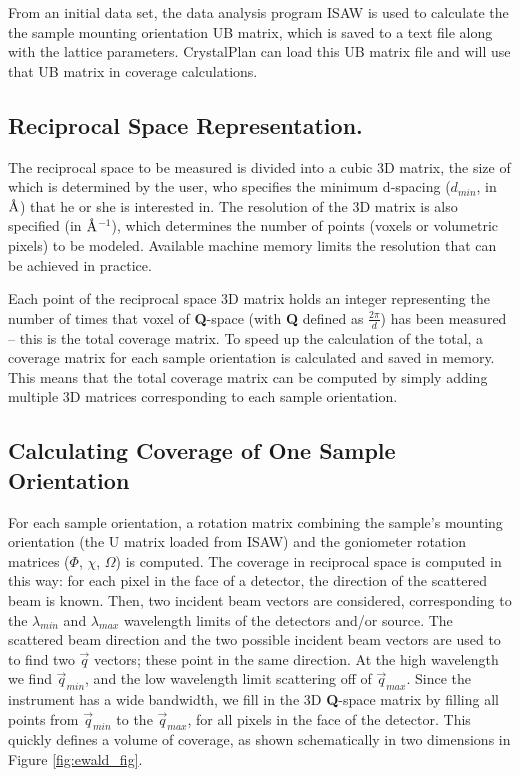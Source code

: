 \documentclass[final]{iucr}              %
\newcommand{\ang}{$\mathrm{\AA} $}
\begin{document}
From an initial data set, the data analysis program ISAW \cite{Tao2006} is used
to calculate the the sample mounting orientation UB matrix, which is saved to a text file along with the lattice
parameters. CrystalPlan can load this UB matrix file and will use that UB matrix
in coverage calculations.
   
  
\subsection{Reciprocal Space Representation.}

The reciprocal space to be measured is divided into a cubic 3D matrix, the size
of which is determined by the user, who specifies the minimum d-spacing
($d_{min}$, in \ang) that he or she is interested in. The resolution of the
3D matrix is also specified (in \ang$^{-1}$), which determines the number of
points (voxels or volumetric pixels) to be modeled. Available machine memory
limits the resolution that can be achieved in practice.

Each point of the reciprocal space 3D matrix holds an integer representing the 
number of times that voxel of {\bf Q}-space (with {\bf Q} defined as $\frac{2\pi}{d}$) has
been measured -- this is the total coverage matrix. To speed up the
calculation of the total, a coverage matrix for each sample orientation is 
calculated and saved in memory. This means that the total coverage matrix can
be computed by simply adding multiple 3D matrices corresponding to each sample orientation. 
 
\subsection{Calculating Coverage of One Sample Orientation}

For each sample orientation, a rotation matrix combining the sample's mounting
orientation (the U matrix loaded from ISAW) and the goniometer rotation matrices
($\Phi$, $\chi$, $\Omega$) is computed. The coverage in reciprocal space is
computed in this way: for each pixel in the face of a detector, the direction of
the scattered beam is known. Then, two incident beam vectors are considered,
corresponding to the $\lambda_{min}$ and $\lambda_{max}$ wavelength limits
of the detectors and/or source. The scattered beam direction and the two possible incident beam vectors
are used to to find two $\overrightarrow q$ vectors; these point in the
same direction. At the high wavelength we find $\overrightarrow q_{min}$, and
the low wavelength limit scattering off of $\overrightarrow q_{max}$. Since the
instrument has a wide bandwidth, we fill in the 3D {\bf Q}-space matrix by
filling all points from $\overrightarrow q_{min}$ to the 
$\overrightarrow q_{max}$, for all pixels in the face of the detector.
This quickly defines a volume of coverage, as shown schematically in
 two dimensions in Figure \ref{fig:ewald_fig}.
\end{document}
